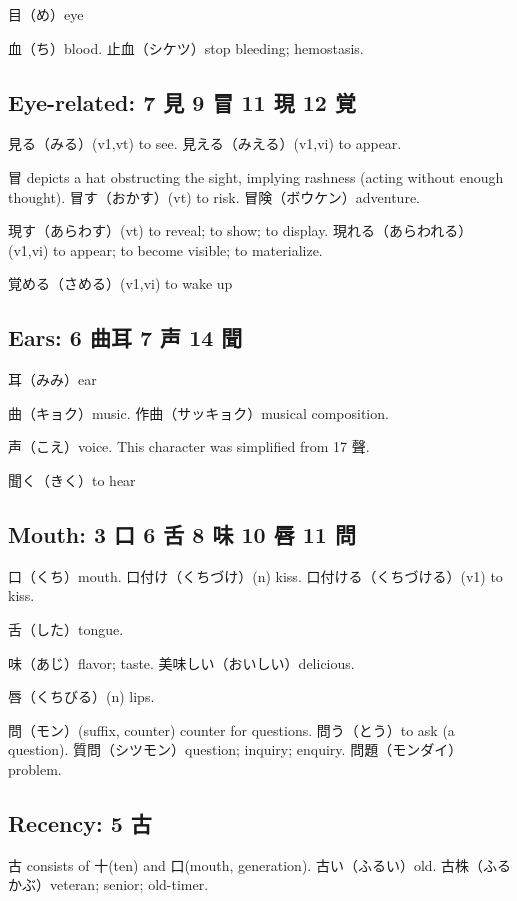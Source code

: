 目（め）eye

血（ち）blood.
止血（シケツ）stop bleeding; hemostasis.

\subsection{Eye-related: 7 見 9 冒 11 現 12 覚}

見る（みる）(v1,vt) to see.
見える（みえる）(v1,vi) to appear.

冒 depicts a hat obstructing the sight, implying rashness
(acting without enough thought).
冒す（おかす）(vt) to risk.
冒険（ボウケン）adventure.

現す（あらわす）(vt) to reveal; to show; to display.
現れる（あらわれる）(v1,vi) to appear; to become visible; to materialize.

覚める（さめる）(v1,vi) to wake up

\subsection{Ears: 6 曲耳 7 声 14 聞}

耳（みみ）ear

曲（キョク）music.
作曲（サッキョク）musical composition.

声（こえ）voice.
This character was simplified from 17 聲.

聞く（きく）to hear

\subsection{Mouth: 3 口 6 舌 8 味 10 唇 11 問}

口（くち）mouth.
口付け（くちづけ）(n) kiss.
口付ける（くちづける）(v1) to kiss.

舌（した）tongue.

味（あじ）flavor; taste.
美味しい（おいしい）delicious.

唇（くちびる）(n) lips.

問（モン）(suffix, counter) counter for questions.
問う（とう）to ask (a question).
質問（シツモン）question; inquiry; enquiry.
問題（モンダイ）problem.

\subsection{Recency: 5 古}

古 consists of 十(ten) and 口(mouth, generation).
古い（ふるい）old.
古株（ふるかぶ）veteran; senior; old-timer.

